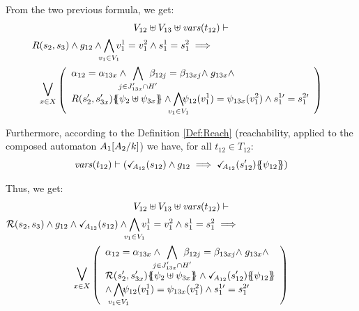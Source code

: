 \documentclass[runningheads]{llncs}
\begin{document}
\begin{enumerate}
From the two previous formula, we get: 
\begin{multline*}
V_{12} \uplus V_{13}  \uplus \fvars{t_{12}} \vdash\\
R\mpar{s_2, s_{3}} \wedge g_{12}  \land \bigwedge_\subbox{v_1\in V_1} v^1_1=v^2_1  \wedge s^1_1 = s^2_1 
\implies \hspace{12em}\\ \operatorname*{\bigsymb{\bigvee}}_{x \in X} \mpar{\everymath{\displaystyle}
\begin{array}{l}
			\alpha_{12} = \alpha_{13x} \wedge \bigwedge_\subbox{j \in J'_{13x} \cap H'} \beta_{12j} = \beta_{13xj} \nwedge g_{13x} \wedge \\
			 R\mpar{s'_2, s'_{3x}}\psubst{\psi_2 \uplus \psi_{3x}} \wedge \bigwedge_\subbox{v_1\in V_1}\!\! \psi_{12}(v^1_1)=\psi_{13x}(v^2_1)  \wedge s^{1\prime}_1 = s^{2\prime}_1
		\end{array}}   
\end{multline*}	


 Furthermore, according to the Definition \ref{Def:Reach} (reachability, applied to the composed automaton \(A_1{\left[A_2\middle/k\right]}\)) we have, for all $t_{12} \in T_{12}$:
\[ \fvars{t_{12}} \vdash \left(\reach{A_{12}}\mpar{s_{12}} \wedge g_{12} \implies \reach{A_{12}}\mpar{s_{12}'}\psubst{\psi_{12}}\right) \]	

Thus, we get:
\begin{multline*}
V_{12} \uplus V_{13}  \uplus \fvars{t_{12}} \vdash\\
\mathcal{R}\mpar{s_2, s_{3}} \wedge g_{12} \land \reach{A_{12}}\mpar{s_{12}} \land \bigwedge_\subbox{v_1\in V_1} v^1_1=v^2_1  \wedge s^1_1 = s^2_1 
\implies \hspace{12em}\\ \operatorname*{\bigsymb{\bigvee}}_{x \in X} \mpar{\everymath{\displaystyle}
\begin{array}{l}
			\alpha_{12} = \alpha_{13x} \wedge \bigwedge_\subbox{j \in J'_{13x} \cap H'} \beta_{12j} = \beta_{13xj} \nwedge g_{13x} \wedge \\
			 \mathcal{R}\mpar{s'_2, s'_{3x}}\psubst{\psi_2 \uplus \psi_{3x}} \land \reach{A_{12}}\mpar{s_{12}'}\psubst{\psi_{12}} \\
\wedge \bigwedge_\subbox{v_1\in V_1}\!\! \psi_{12}(v^1_1)=\psi_{13x}(v^2_1)  \wedge s^{1\prime}_1 = s^{2\prime}_1
		\end{array}}   
\end{multline*}	




\end{enumerate}
\end{document}
